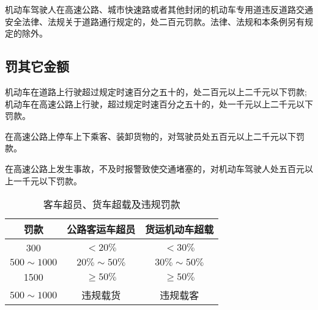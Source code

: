 机动车驾驶人在高速公路、城市快速路或者其他封闭的机动车专用道违反道路交通安全法律、法规关于道路通行规定的，处二百元罚款。法律、法规和本条例另有规定的除外。

\subsection{罚其它金额}

机动车在道路上行驶超过规定时速百分之五十的，处二百元以上二千元以下罚款;机动车在高速公路上行驶，超过规定时速百分之五十的，处一千元以上二千元以下罚款。

在高速公路上停车上下乘客、装卸货物的，对驾驶员处五百元以上二千元以下罚款。

在高速公路上发生事故，不及时报警致使交通堵塞的，对机动车驾驶人处五百元以上一千元以下罚款。

% 
% 
% 
% 


\begin{table}[htbp]
\centering
\caption{客车超员、货车超载及违规罚款}
    \begin{tabular}{|c|c|c|}
        \hline
        \textbf{罚款}  & \textbf{公路客运车超员} & \textbf{货运机动车超载} \\
        \hline
        300 & $< 20\%$ & $< 30\%$ \\
        \hline
        $500 \sim 1000$ & $20\% \sim 50\%$ & $30\% \sim 50\%$ \\
        \hline
        1500 & $\ge 50\%$ & $\ge 50\%$ \\
        \hline
        $500 \sim 1000$ & 违规载货 & 违规载客 \\
        \hline
    \end{tabular}
    \label{tab:penalty}
\end{table}

